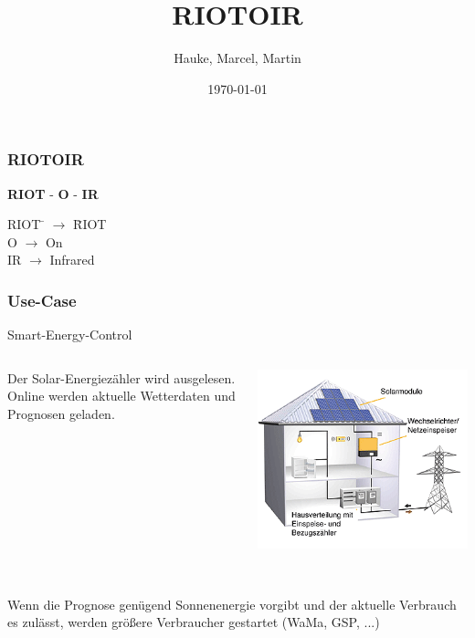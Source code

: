 \documentclass{beamer}
\title{RIOTOIR}
\author{Hauke, Marcel, Martin}
\date{\today}
\begin{document}
\beamertemplatenavigationsymbolsempty
\unitlength 5mm

\maketitle

\begin{frame} %
  \frametitle{ RIOTOIR } %
  \begin{block}{\textbf{RIOT} - \textbf{O} - \textbf{IR}}
  	\begin{tabbing}
    	RIOT \= $\rightarrow$ \= RIOT\\
    	\break
    	O  	 \> $\rightarrow$ \> On\\
		\break    	
    	IR   \> $\rightarrow$ \> Infrared\\
		\end{tabbing} 
  \end{block}
\end{frame}



\begin{frame} %
  \frametitle{ Use-Case } %
  \begin{block}{ Smart-Energy-Control }
  	\begin{columns}
			\begin{column}{6cm}
				\break
  			Der Solar-Energiezähler wird ausgelesen.\\
  			\break
  			Online werden aktuelle Wetterdaten und Prognosen geladen.\\
  		\end{column}
  		\begin{column}{3.5cm}
  			\includegraphics[scale=0.4]{Medien/solarHaus.png}\\ 
  		\end{column}
		\end{columns}
		\ \\
		\break
  	Wenn die Prognose genügend Sonnenenergie vorgibt und der aktuelle Verbrauch es zulässt, werden größere Verbraucher gestartet (WaMa, GSP, ...) 
		
  \end{block}
  
\end{frame}
\end{document}
